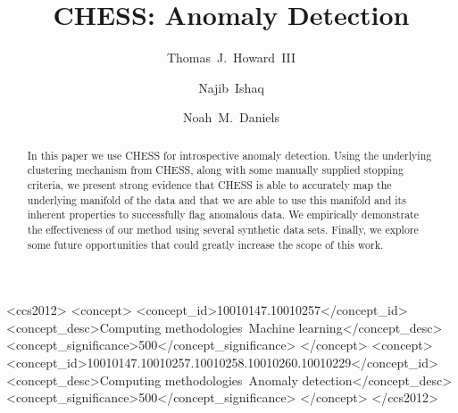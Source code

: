 \documentclass[sigconf]{acmart}
\begin{document}
\title{CHESS: Anomaly Detection}

\author{Thomas~J.~Howard~III}

\author{Najib~Ishaq}
\authornotemark[1]

\author{Noah~M.~Daniels}

\renewcommand{\shortauthors}{Howard and Ishaq, et al.}

\begin{abstract}
In this paper we use CHESS for introspective anomaly detection.
Using the underlying clustering mechanism from CHESS, along with some manually supplied stopping criteria, we present strong evidence that CHESS is able to accurately map the underlying manifold of the data and that we are able to use this manifold and its inherent properties to successfully flag anomalous data.
We empirically demonstrate the effectiveness of our method using several synthetic data sets.
Finally, we explore some future opportunities that could greatly increase the scope of this work.
\end{abstract}

\begin{CCSXML}
<ccs2012>
   <concept>
       <concept_id>10010147.10010257</concept_id>
       <concept_desc>Computing methodologies~Machine learning</concept_desc>
       <concept_significance>500</concept_significance>
       </concept>
   <concept>
       <concept_id>10010147.10010257.10010258.10010260.10010229</concept_id>
       <concept_desc>Computing methodologies~Anomaly detection</concept_desc>
       <concept_significance>500</concept_significance>
       </concept>
 </ccs2012>
\end{CCSXML}



\maketitle









\end{document}
